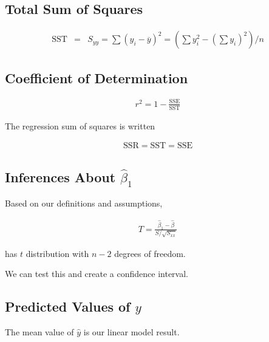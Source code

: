     \subsection{Total Sum of Squares}
    \begin{equation*}
        \begin{aligned}
            \text{SST} &=& S_{yy} = \sum\left( y_i - \overline{y} \right)^2 = \left(\sum y_i^2 - \left( \sum y_i \right)^2
            \right) / n
        \end{aligned}
    \end{equation*}

    \subsection{Coefficient of Determination}

    \begin{equation*}
        \begin{aligned}
            r^2 = 1 - \frac{\text{SSE} }{\text{SST} }
        \end{aligned}
    \end{equation*}

    The regression sum of squares is written

    \begin{equation*}
        \begin{aligned}
            \text{SSR} = \text{SST} = \text{SSE}
        \end{aligned}
    \end{equation*}

    \subsection{Inferences About $\hat{\beta}_1$}
    Based on our definitions and assumptions,

    \begin{equation*}
        \begin{aligned}
            T = \frac{\hat{\beta}_1 - \hat{\beta} }{S / \sqrt{S_{xx} } }
        \end{aligned}
    \end{equation*}

    has $t$ distribution with $n - 2$ degrees of freedom.

    We can test this and create a confidence interval.

    \subsection{Predicted Values of $y$}
    The mean value of $\hat{y}$ is our linear model result.

